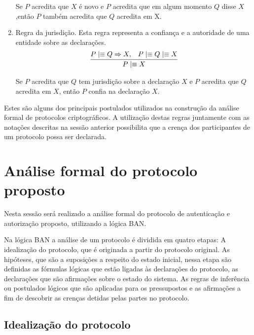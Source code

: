 \begin{enumerate}[ A )]
   Se $P$ acredita que $X$ é novo e $P$ acredita que em algum momento $Q$ disse $X$,então $P$ também acredita que $Q$ acredita em X.

\item Regra da jurisdição. Esta regra representa a confiança e a autoridade de uma entidade sobre as declarações.
\begin{displaymath}
    \infer
    {{P}\mid\equiv{X}}
    {{P}\mid\equiv{{Q}\Rightarrow {X},}& {P}\mid\equiv{{Q}\mid\equiv{X}}}
  \end{displaymath}

   Se $P$  acredita que $Q$ tem jurisdição sobre a declaração $X$ e $P$ acredita que $Q$ acredita em $X$, então $P$ confia na declaração $X$.

\end{enumerate}

Estes são alguns dos principais postulados utilizados na construção da análise formal de protocolos criptográficos. A utilização destas regras juntamente com as notações descritas na sessão anterior possibilita que a crença dos participantes de um protocolo possa ser declarada.

\section{Análise formal do protocolo proposto}
Nesta sessão será realizado a análise formal do protocolo de autenticação e autorização proposto, utilizando a lógica BAN.

Na lógica BAN a análise de um protocolo é dividida em quatro etapas: A idealização do protocolo, que é originada a partir do protocolo original. As hipóteses, que são a suposições a respeito do estado inicial, nessa etapa são definidas as fórmulas lógicas que estão ligadas às declarações do protocolo, as declarações que são afirmações sobre o estado do sistema. As regras de inferência ou postulados lógicos que são aplicadas para os pressupostos e as afirmações a fim de descobrir as crenças detidas pelas partes no protocolo. %

\subsection{Idealização do protocolo}
\newcommand{\HT}[3]{\{\,{#1}\,\}\,{#2}\,\{\,{#3}\,\}}
\newcommand{\Msg}[3]{{#1}\longrightarrow{#2}:\,{#3}}

